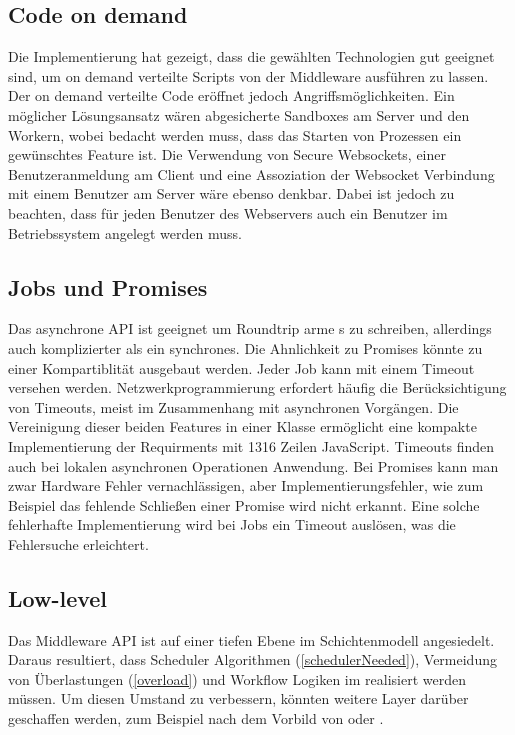 \begin{multicols}{2}
\subsection{Code on demand}
Die Implementierung hat gezeigt, dass die gewählten Technologien gut geeignet sind, um on demand verteilte Scripts von der Middleware ausführen zu lassen.
Der on demand verteilte Code eröffnet jedoch Angriffsmöglichkeiten.
Ein möglicher Lösungsansatz wären abgesicherte Sandboxes am Server und den Workern, wobei bedacht werden muss, dass das Starten von Prozessen ein gewünschtes Feature ist.
Die Verwendung von Secure Websockets, einer Benutzeranmeldung am Client und eine Assoziation der Websocket Verbindung mit einem Benutzer am Server wäre ebenso denkbar.
Dabei ist jedoch zu beachten, dass für jeden Benutzer des Webservers auch ein Benutzer im Betriebssystem angelegt werden muss.


\subsection{Jobs und Promises}
Das asynchrone API ist geeignet um Roundtrip arme \jobScript s zu schreiben, allerdings auch komplizierter als ein synchrones.
Die Ahnlichkeit zu \JavaScript{} Promises könnte zu einer Kompartiblität ausgebaut werden.
Jeder Job kann mit einem Timeout versehen werden.
Netzwerkprogrammierung erfordert häufig die Berücksichtigung von Timeouts, meist im Zusammenhang mit asynchronen Vorgängen.
Die Vereinigung dieser beiden Features in einer Klasse ermöglicht eine kompakte Implementierung der Requirments mit 1316 Zeilen JavaScript.
Timeouts finden auch bei lokalen asynchronen Operationen Anwendung.
Bei Promises kann man zwar Hardware Fehler vernachlässigen, aber Implementierungsfehler, wie zum Beispiel das fehlende Schließen einer Promise wird nicht erkannt.
Eine solche fehlerhafte Implementierung wird bei Jobs ein Timeout auslösen, was die Fehlersuche erleichtert.

\subsection{Low-level}
Das Middleware API ist auf einer tiefen Ebene im Schichtenmodell angesiedelt.
Daraus resultiert, dass Scheduler Algorithmen (\ref{schedulerNeeded}), Vermeidung von Überlastungen (\ref{overload}) und Workflow Logiken im \ApplicationLayer{} realisiert werden müssen.
Um diesen Umstand zu verbessern, könnten weitere Layer darüber geschaffen werden,
zum Beispiel nach dem Vorbild von \MapReduce{} oder \ApacheSpark{}.


\end{multicols}
